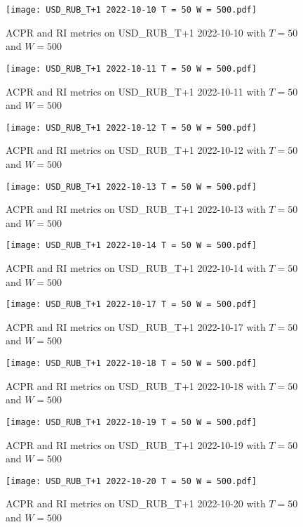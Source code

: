 \begin{figure}[htbp]
	\texttt{[image: USD\_RUB\_T+1 2022-10-10 T = 50 W = 500.pdf]}
	\caption{ACPR and RI metrics on USD\_RUB\_T+1 2022-10-10 with $T = 50$ and $W = 500$}
\end{figure}

\begin{figure}[htbp]
	\texttt{[image: USD\_RUB\_T+1 2022-10-11 T = 50 W = 500.pdf]}
	\caption{ACPR and RI metrics on USD\_RUB\_T+1 2022-10-11 with $T = 50$ and $W = 500$}
\end{figure}

\begin{figure}[htbp]
	\texttt{[image: USD\_RUB\_T+1 2022-10-12 T = 50 W = 500.pdf]}
	\caption{ACPR and RI metrics on USD\_RUB\_T+1 2022-10-12 with $T = 50$ and $W = 500$}
\end{figure}

\begin{figure}[htbp]
	\texttt{[image: USD\_RUB\_T+1 2022-10-13 T = 50 W = 500.pdf]}
	\caption{ACPR and RI metrics on USD\_RUB\_T+1 2022-10-13 with $T = 50$ and $W = 500$}
\end{figure}

\begin{figure}[htbp]
	\texttt{[image: USD\_RUB\_T+1 2022-10-14 T = 50 W = 500.pdf]}
	\caption{ACPR and RI metrics on USD\_RUB\_T+1 2022-10-14 with $T = 50$ and $W = 500$}
\end{figure}

\begin{figure}[htbp]
	\texttt{[image: USD\_RUB\_T+1 2022-10-17 T = 50 W = 500.pdf]}
	\caption{ACPR and RI metrics on USD\_RUB\_T+1 2022-10-17 with $T = 50$ and $W = 500$}
\end{figure}

\begin{figure}[htbp]
	\texttt{[image: USD\_RUB\_T+1 2022-10-18 T = 50 W = 500.pdf]}
	\caption{ACPR and RI metrics on USD\_RUB\_T+1 2022-10-18 with $T = 50$ and $W = 500$}
\end{figure}

\begin{figure}[htbp]
	\texttt{[image: USD\_RUB\_T+1 2022-10-19 T = 50 W = 500.pdf]}
	\caption{ACPR and RI metrics on USD\_RUB\_T+1 2022-10-19 with $T = 50$ and $W = 500$}
\end{figure}

\begin{figure}[htbp]
	\texttt{[image: USD\_RUB\_T+1 2022-10-20 T = 50 W = 500.pdf]}
	\caption{ACPR and RI metrics on USD\_RUB\_T+1 2022-10-20 with $T = 50$ and $W = 500$}
\end{figure}

